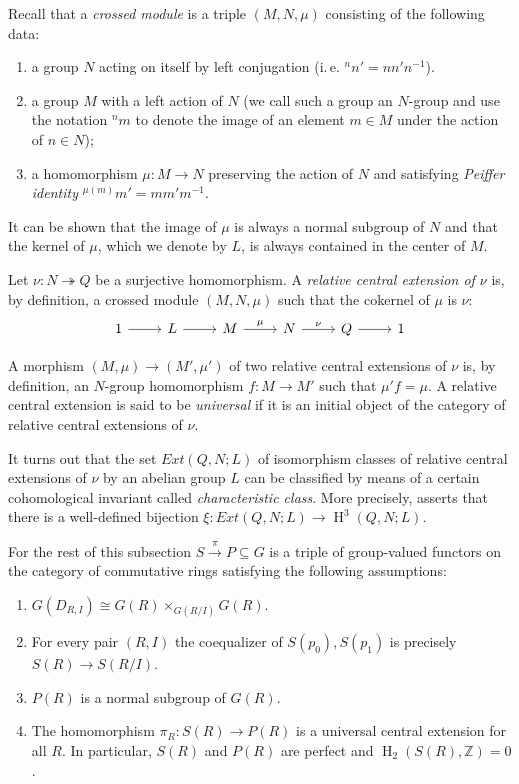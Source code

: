 \documentclass[10pt,a4paper,twoside]{article}
\theoremstyle{remark}
\theoremstyle{definition}
\numberwithin{lemma}{section}
\numberwithin{prop}{section}
\numberwithin{corollary}{section}
\numberwithin{externaltheorem}{section}
\DeclareMathOperator{\HH}{H}
\newcommand{\ZZ}{\mathbb{Z}}
\numberwithin{equation}{section}
\begin{document}
Recall that a {\it crossed module} is a triple $(M, N, \mu)$ consisting of the following data:
\begin{enumerate} [label=\normalfont(\arabic*)]
 \item a group $N$ acting on itself by left conjugation (i.\,e. ${}^{n}\!n' = n n' n^{-1}$).
 \item a group $M$ with a left action of $N$ (we call such a group an $N$-group and use the notation ${}^n m$ to denote the image of an element $m\in M$ under the action of $n \in N$);
 \item a homomorphism $\mu \colon M\to N$ preserving the action of $N$ and satisfying {\it Peiffer identity} ${}^{\mu(m)}\!m' = m m' m^{-1}$.
\end{enumerate}
It can be shown that the image of $\mu$ is always a normal subgroup of $N$ and that the kernel of $\mu$, which we denote by $L$, is always contained in the center of $M$.
 
Let $\nu \colon N \twoheadrightarrow Q$ be a surjective homomorphism.
A {\it relative central extension of $\nu$} is, by definition,
a crossed module $(M, N, \mu)$ such that the cokernel of $\mu$ is $\nu$:
\begin{equation} \label{RelativeCentralExtension} \begin{tikzcd} 1 \arrow{r} & L \arrow{r} & M \arrow{r}{\mu} & N \arrow{r}{\nu} & Q \arrow{r} & 1 \end{tikzcd} \end{equation}

A morphism $(M, \mu) \to (M', \mu')$ of two relative central extensions of $\nu$ is, by definition, an $N$-group homomorphism $f\colon M \to M'$ such that $\mu' f = \mu$. 
A relative central extension is said to be {\it universal} if it is an initial object of the category of relative central extensions of $\nu$. 

It turns out that the set $Ext(Q, N; L)$ of isomorphism classes of relative central extensions of $\nu$ by an abelian group $L$ can be classified by means of a certain cohomological invariant called {\it characteristic class}. More precisely, \cite[Th{\'e}or{\`e}me~1]{Lo78} asserts that there is a well-defined bijection $\xi \colon Ext(Q, N; L) \to \HH^3(Q, N; L)$.
 
For the rest of this subsection $S \xrightarrow{\pi} P \subseteq G$ is a triple of group-valued functors on the category of commutative rings satisfying the following assumptions:
\begin{enumerate} [label=\normalfont(A\arabic*)]
 \item \label{req:left-exact} $G(D_{R, I}) \cong G(R) \times_{G(R/I)} G(R)$.
 \item \label{req:coeq} For every pair $(R, I)$ the coequalizer of $S(p_0), S(p_1)$ is precisely $S(R) \to S(R/I)$.
 \item \label{req:subfunc} $P(R)$ is a normal subgroup of $G(R)$.
 \item \label{req:uce} The homomorphism $ \pi_R \colon S(R) \to P(R)$ is a universal central extension for all $R$. In particular, $S(R)$ and $P(R)$ are perfect and $\HH_2(S(R), \ZZ) = 0$.
\end{enumerate}
\end{document}
